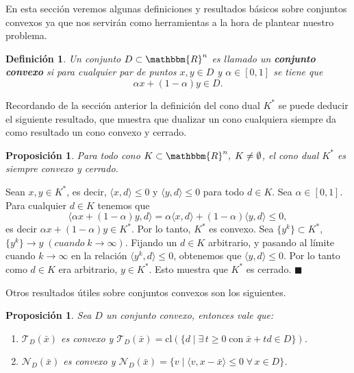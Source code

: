 \documentclass[a4paper,12pt]{report}
\newcommand{\la}{\langle}
\newcommand{\ra}{\rangle}
\newcommand{\RR}{\mathbbm{R}}
\newcommand{\Rn}{\RR^n}
\newcommand{\bx}{\bar{x}}
\newcommand{\cN}{\mathcal{N}}
\newcommand{\cT}{\mathcal{T}}
\newcommand{\arr}{\rightarrow}
\newtheorem{prop}[teo]{Proposici\'on}
\newtheorem{defi}[teo]{Definici\'on}
\newenvironment{dem}{\vspace*{-0.1cm}{\it Demostraci\'on:}}{\hfill
$\blacksquare$\\}
\begin{document}
En esta secci\'on veremos algunas definiciones y resultados b\'asicos sobre conjuntos convexos ya que nos servir\'an como herramientas a la hora de plantear nuestro problema.

\begin{defi}
Un conjunto $D\subset\Rn$ es llamado un \textbf{conjunto convexo} si para cualquier par de puntos $x,y\in D$ y $\alpha\in[0,1]$ se tiene que $$\alpha x + (1-\alpha)y\in D.$$
\end{defi}

Recordando de la secci\'on anterior la definici\'on del cono dual $K^*$ se puede deducir el siguiente resultado, que muestra que dualizar un cono cualquiera siempre da como resultado un cono convexo y cerrado.

\begin{prop}
Para todo cono $K\subset\Rn,\;K\neq\emptyset$, el cono dual $K^*$ es siempre convexo y cerrado. 
\end{prop}


\begin{dem}
Sean $x,y\in K^*$, es decir, $\la x,d\ra\leq 0$ y $\la y,d\ra\leq 0$ para todo $d\in K$. Sea $\alpha\in [0,1]$. Para cualquier $d\in K$ tenemos que $$\la\alpha x+(1-\alpha)y,d\ra=\alpha\la x,d\ra+(1-\alpha)\la y,d\ra\leq 0,$$
es decir $\alpha x+(1-\alpha)y\in K^*$. Por lo tanto, $K^*$ es convexo.
Sea $\{y^k\}\subset K^*$, $\{y^k\}\arr y\; (cuando\; k\arr\infty)$. Fijando un $d\in K$ arbitrario, y pasando al l\'imite cuando $k\arr\infty$ en la relaci\'on $\la y^k,d\ra\leq 0$, obtenemos que $\la y,d\ra\leq 0$. Por lo tanto como $d\in K$ era arbitrario, $y\in K^*$. Esto muestra que $K^*$ es cerrado.
\end{dem}


Otros resultados \'utiles sobre conjuntos convexos son los siguientes.

\begin{prop}
Sea $D$ un conjunto convexo, entonces vale que:
\begin{enumerate}
\item $\cT_{D}(\bx)$ es convexo y $\cT_{D}(\bx)=\mathrm{cl}(\{d\mid\exists\, t\geq 0\;\mathrm{con}\;\bx+td\in D\})$.
\item $\cN_{D}(\bx)$ es convexo y $\mathcal{N}_{D}(\bx)=\{v\mid\la v,x-\bx\ra\leq 0\; \forall\,x\in D\}$.
\end{enumerate}
\end{prop}
\end{document}
